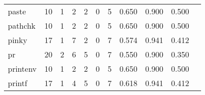 \begin{longtable}{lp{1.2cm}p{1.2cm}p{1.2cm}p{1.2cm}p{1.2cm}p{1.2cm}p{1.2cm}p{1.2cm}p{1.2cm}p{1.2cm}}
paste     &                                    10 &                                                  1 &                                                  2 &                                                  2 &                                                  0 &                                                  5 &                                         0.650 &                                              0.900 &                                              0.500 \\
pathchk   &                                    10 &                                                  1 &                                                  2 &                                                  2 &                                                  0 &                                                  5 &                                         0.650 &                                              0.900 &                                              0.500 \\
pinky     &                                    17 &                                                  1 &                                                  7 &                                                  2 &                                                  0 &                                                  7 &                                         0.574 &                                              0.941 &                                              0.412 \\
pr        &                                    20 &                                                  2 &                                                  6 &                                                  5 &                                                  0 &                                                  7 &                                         0.550 &                                              0.900 &                                              0.350 \\
printenv  &                                    10 &                                                  1 &                                                  2 &                                                  2 &                                                  0 &                                                  5 &                                         0.650 &                                              0.900 &                                              0.500 \\
printf    &                                    17 &                                                  1 &                                                  4 &                                                  5 &                                                  0 &                                                  7 &                                         0.618 &                                              0.941 &                                              0.412 \\

\end{longtable}
